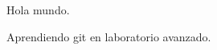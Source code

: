 \documentclass{article}
\begin{document}
Hola mundo.

Aprendiendo git en laboratorio avanzado.
\end{document}
